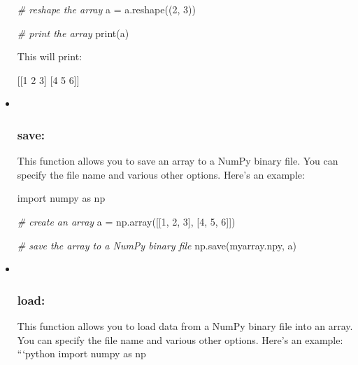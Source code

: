 \documentclass[11pt]{article}
\newenvironment{Shaded}{}{}
\newcommand{\DecValTok}[1]{\textcolor[rgb]{0.25,0.63,0.44}{{#1}}}
\newcommand{\StringTok}[1]{\textcolor[rgb]{0.25,0.44,0.63}{{#1}}}
\newcommand{\CommentTok}[1]{\textcolor[rgb]{0.38,0.63,0.69}{\textit{{#1}}}}
\newcommand{\NormalTok}[1]{{#1}}
\newcommand{\ImportTok}[1]{{#1}}
\newcommand{\OperatorTok}[1]{\textcolor[rgb]{0.40,0.40,0.40}{{#1}}}
\newcommand{\BuiltInTok}[1]{{#1}}
\begin{document}
\begin{itemize}
\begin{Shaded}
\begin{Highlighting}[]
\CommentTok{\# reshape the array}
\NormalTok{a }\OperatorTok{=}\NormalTok{ a.reshape((}\DecValTok{2}\NormalTok{, }\DecValTok{3}\NormalTok{))}

\CommentTok{\# print the array}
\BuiltInTok{print}\NormalTok{(a)}
\end{Highlighting}
\end{Shaded}

  This will print:

\begin{Shaded}
\begin{Highlighting}[]
\NormalTok{[[}\DecValTok{1} \DecValTok{2} \DecValTok{3}\NormalTok{]}
\NormalTok{ [}\DecValTok{4} \DecValTok{5} \DecValTok{6}\NormalTok{]]}
\end{Highlighting}
\end{Shaded}
\item ~
  \hypertarget{save}{%
  \subsubsection{save:}\label{save}}

  This function allows you to save an array to a NumPy binary file. You
  can specify the file name and various other options. Here's an
  example:

\begin{Shaded}
\begin{Highlighting}[]
\ImportTok{import}\NormalTok{ numpy }\ImportTok{as}\NormalTok{ np}

\CommentTok{\# create an array}
\NormalTok{a }\OperatorTok{=}\NormalTok{ np.array([[}\DecValTok{1}\NormalTok{, }\DecValTok{2}\NormalTok{, }\DecValTok{3}\NormalTok{], [}\DecValTok{4}\NormalTok{, }\DecValTok{5}\NormalTok{, }\DecValTok{6}\NormalTok{]])}

\CommentTok{\# save the array to a NumPy binary file}
\NormalTok{np.save(}\StringTok{\textquotesingle{}myarray.npy\textquotesingle{}}\NormalTok{, a)}
\end{Highlighting}
\end{Shaded}
\item ~
  \hypertarget{load}{%
  \subsubsection{load:}\label{load}}

  This function allows you to load data from a NumPy binary file into an
  array. You can specify the file name and various other options. Here's
  an example: ```python import numpy as np


\end{itemize}
\end{document}
